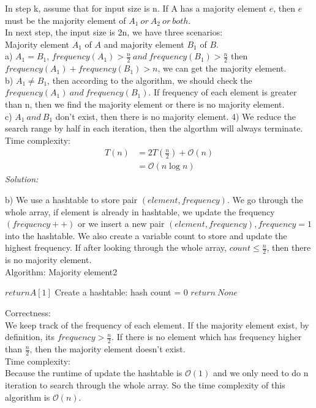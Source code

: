 \documentclass[12pt,letterpaper]{article}
\newcommand{\solution}{\textit{Solution:}\par}
\begin{document}
In step k, assume that for input size is n. If A has a majority element $e$, then $e$ must be the majority element of $A_1\ or\ A_2\ or\ both$. \\
In next step, the input size is 2n, we have three scenarios: \\
Majority element $A_1$ of $A$ and majority element $B_1$ of $B$. \\
a) $A_1 = B_1$, $frequency(A_1) > \frac{n}{2}\ and\  frequency(B_1)> \frac{n}{2}$ then $frequency(A_1)+frequency(B_1) > n$, we can get the majority element. \\
b) $A_1 \neq B_1$, then according to the algorithm, we should check the $frequency(A_1)\ and\ frequency(B_1)$. If frequency of each element is greater than n, then we find the majority element or there is no majority element. \\
c) $A_1\ and\ B_1$ don't exist, then there is no majority element.
4) We reduce the search range by half in each iteration, then the algorthm will always terminate. \\
Time complexity:
\begin{align*}
T(n) &= 2T(\frac{n}{2}) + \mathcal{O}(n) \\
&= \mathcal{O}(n \log n )
\end{align*}
\solution
b) We use a hashtable to store pair $(element,frequency)$. We go through the whole array, if element is already in hashtable, we update the frequency$(frequency++)$ or we insert a new pair $(element,frequency),frequency = 1$ into the hashtable. We also create a variable count to store and update the highest frequency. If after looking through the whole array, $count \le \frac{n}{2}$, then there is no majority element. \\
Algorithm: Majority element2 \\
\begin{algorithm}[H]
 {
	$return A[1]$ \;
}
Create a hashtable: hash \;
count = 0 \;
 $return\  None$ \;
\end{algorithm}
Correctness: \\
We keep track of the frequency of each element. If the majority element exist, by definition, its $frequency > \frac{n}{2}$. If there is no element which has frequency higher than $\frac{n}{2}$, then the majority element doesn't exist. \\
Time complexity: \\
Because the runtime of update the hashtable is $\mathcal{O}(1)$ and we only need to do n iteration to search through the whole array. So the time complexity of this algorithm is $\mathcal{O}(n)$.
\end{document}
